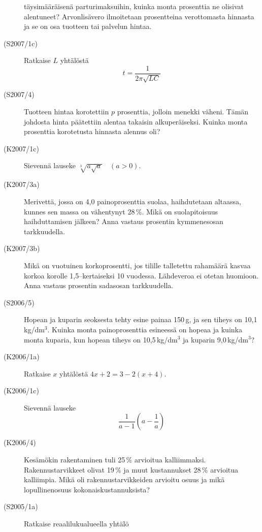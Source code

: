 \begin{description}
                        täysimääräisenä parturimaksuihin, kuinka monta prosenttia
                        ne olisivat alentuneet? Arvonlisävero ilmoitetaan prosentteina
                        verottomasta hinnasta ja se on osa tuotteen tai palvelun hintaa.
    \item[(S2007/1c)]  Ratkaise $L$ yhtälöstä
                        \[ t = \frac{1}{2\pi\sqrt{LC}} \]
    \item[(S2007/4)]   Tuotteen hintaa korotettiin $p$ prosenttia, jolloin menekki väheni.
                        Tämän johdosta hinta päätettiin alentaa takaisin alkuperäiseksi.
                        Kuinka monta prosenttia korotetusta hinnasta alennus oli?
    \item[(K2007/1c)]  Sievennä lauseke $ \sqrt[3]{a \sqrt{a}} \quad (a > 0) $.
    \item[(K2007/3a)]  Merivettä, jossa on 4,0 painoprosenttia suolaa, haihdutetaan
                        altaassa, kunnes sen massa on vähentynyt 28\,\%. Mikä on
                        suolapitoisuus haihduttamisen jälkeen? Anna vastaus prosentin
                        kymmenesosan tarkkuudella. 
    \item[(K2007/3b)]  Mikä on vuotuinen korkoprosentti, jos tilille talletettu rahamäärä
                        kasvaa korkoa korolle 1,5--kertaiseksi 10 vuodessa. Lähdeveroa
                        ei otetan huomioon. Anna vastaus prosentin sadasosan 
                        tarkkuudella.
    \item[(S2006/5)]   Hopean ja kuparin seoksesta tehty esine painaa 150\,g, ja sen
                        tiheys on 10,1\,kg/dm\(^3\). Kuinka monta painoprosenttia
                        esineessä on hopeaa ja kuinka monta kuparia, kun hopean tiheys on 
                        10,5\,kg/dm\(^3\) ja kuparin 9,0\,kg/dm\(^3\)?
    \item[(K2006/1a)]  Ratkaise $x$ yhtälöstä $4x + 2 =  3 - 2(x + 4)$.
    \item[(K2006/1c)]  Sievennä lauseke 
                        \[ \frac{1}{a - 1} \left( a - \frac{1}{a} \right) \]
    \item[(K2006/4)]   Kesämökin rakentaminen tuli 25\,\% arvioitua kalliimmaksi.
                        Rakennustarvikkeet olivat 19\,\% ja muut kustannukset 28\,\%
                        arvioitua kalliimpia. Mikä oli rakennustarvikkeiden arvioitu osuus ja 
                        mikä lopullinenosuus kokonaiskustannuksista?
    \item[(S2005/1a)]  Ratkaise reaalilukualueella yhtälö 

\end{description}
